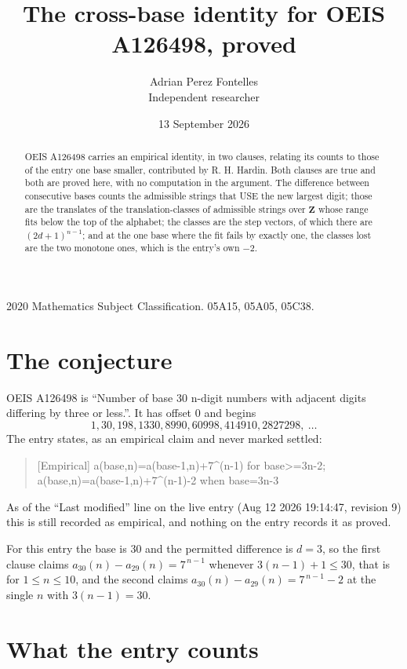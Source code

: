 \documentclass[11pt,a4paper]{article}
\title{The cross-base identity for OEIS A126498, proved}
\author{Adrian Perez Fontelles\\ \small Independent researcher}
\date{13 September 2026}
\theoremstyle{plain}
\theoremstyle{definition}
\begin{document}
\maketitle

\begin{abstract}
OEIS A126498 carries an empirical identity, in two clauses, relating its counts to those of the
entry one base smaller, contributed by R. H. Hardin. Both clauses are true and both are proved
here, with no computation in the argument. The difference between consecutive bases counts the
admissible strings that USE the new largest digit; those are the translates of the
translation-classes of admissible strings over $\mathbf{Z}$ whose range fits below the top of
the alphabet; the classes are the step vectors, of which there are $(2d+1)^{n-1}$; and at the
one base where the fit fails by exactly one, the classes lost are the two monotone ones, which
is the entry's own $-2$.
\end{abstract}

\noindent\small 2020 Mathematics Subject Classification. 05A15, 05A05, 05C38.\normalsize

\section{The conjecture}

OEIS A126498 is ``Number of base 30 n-digit numbers with adjacent digits differing by three or less.''. It has offset $0$ and begins
\[
1, 30, 198, 1330, 8990, 60998, 414910, 2827298,\ \dots
\]
The entry states, as an empirical claim and never marked settled:
\begin{quote}
[Empirical] a(base,n)=a(base-1,n)+7\textasciicircum{}(n-1) for base>=3n-2; a(base,n)=a(base-1,n)+7\textasciicircum{}(n-1)-2 when base=3n-3
\end{quote}
As of the ``Last modified'' line on the live entry (Aug 12 2026 19:14:47, revision 9)
this is still recorded as empirical, and nothing on the entry records it as proved.

For this entry the base is $30$ and the permitted difference is $d=3$, so the first clause
claims $a_{30}(n)-a_{29}(n)=7^{\,n-1}$ whenever $3(n-1)+1\le30$, that is for
$1\le n\le10$, and the second claims $a_{30}(n)-a_{29}(n)=7^{\,n-1}-2$ at the single
$n$ with $3(n-1)=30$.

\section{What the entry counts}
\end{document}
